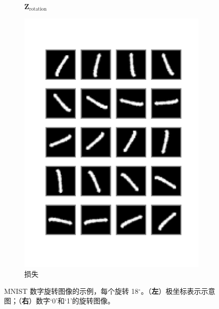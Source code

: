\documentclass[../../book-main.tex]{subfiles}
\begin{document}
\begin{example}[数字的不变分类]
\begin{figure}[t]
\begin{subfigure}[t]{0.3\textwidth}
        \caption{$\bm{Z}_{\text{rotation}}$}
    \end{subfigure}
    \hfill
    \begin{subfigure}[t]{0.3\textwidth}
        \centering
        \includegraphics[width=\textwidth]{figs_chap4/mnist1d_img1.pdf}
        \caption{损失}
    \end{subfigure}
    \caption{\small MNIST 数字旋转图像的示例，每个旋转 18$^{\circ}$。（\textbf{左}）极坐标表示示意图；（\textbf{右}）数字‘0’和‘1’的旋转图像。}
    \label{fig:samples-invariant-1d-mnist-diagram}
\end{figure}



\end{example}
\end{document}
